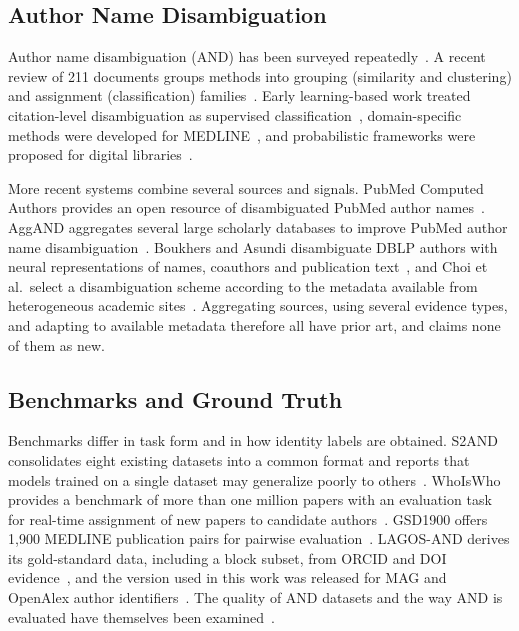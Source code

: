 \subsection{Author Name Disambiguation}
Author name disambiguation (AND) has been surveyed repeatedly~\cite{ferreira2012brief,debonis2023graph}. A recent review of 211 documents groups methods into grouping (similarity and clustering) and assignment (classification) families~\cite{rodrigues2024andreview}. Early learning-based work treated citation-level disambiguation as supervised classification~\cite{han2004twosupervised}, domain-specific methods were developed for MEDLINE~\cite{torvik2009authority}, and probabilistic frameworks were proposed for digital libraries~\cite{tang2012unified}.

More recent systems combine several sources and signals. PubMed Computed Authors provides an open resource of disambiguated PubMed author names~\cite{tian2024pubmedcomputedauthors}. AggAND aggregates several large scholarly databases to improve PubMed author name disambiguation~\cite{zhang2021aggand}. Boukhers and Asundi disambiguate DBLP authors with neural representations of names, coauthors and publication text~\cite{boukhers2024deepdblp}, and Choi et al.\ select a disambiguation scheme according to the metadata available from heterogeneous academic sites~\cite{choi2024heterogeneoussites}. Aggregating sources, using several evidence types, and adapting to available metadata therefore all have prior art, and \hammer{} claims none of them as new.

\subsection{Benchmarks and Ground Truth}
Benchmarks differ in task form and in how identity labels are obtained. S2AND consolidates eight existing datasets into a common format and reports that models trained on a single dataset may generalize poorly to others~\cite{subramanian2021s2and}. WhoIsWho provides a benchmark of more than one million papers with an evaluation task for real-time assignment of new papers to candidate authors~\cite{chen2023whoiswho}. GSD1900 offers 1,900 MEDLINE publication pairs for pairwise evaluation~\cite{vishnyakova2019gsd1900}. LAGOS-AND derives its gold-standard data, including a block subset, from ORCID and DOI evidence~\cite{zhang2023lagosand}, and the version used in this work was released for MAG and OpenAlex author identifiers~\cite{zhang2022lagosandv2}. The quality of AND datasets and the way AND is evaluated have themselves been examined~\cite{muller2017datasets,kim2018dblp}.

